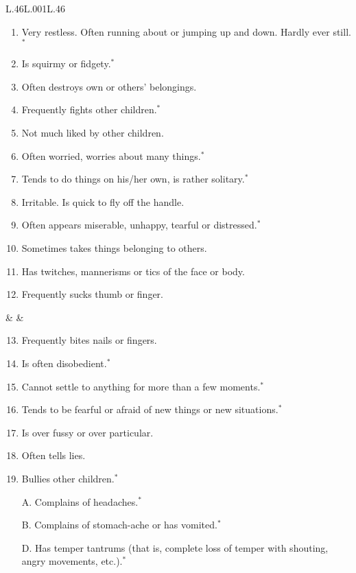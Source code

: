 \begin{table}[ht!]
\caption{Behavioural screening scales in the BCS and MCS five-year surveys}\label{tab:scales}
\centering{} \footnotesize
\begin{tabular}{L{.46\linewidth}L{.001\linewidth}L{.46\linewidth}}
\toprule
{} \\[-1.8em]
\begin{enumerate}
\item Very restless. Often running about or jumping up and down. Hardly ever still.$^*$
\item Is squirmy or fidgety.$^*$
\item Often destroys own or others' belongings.
\item Frequently fights other children.$^*$
\item Not much liked by other children.
\item Often worried, worries about many things.$^*$
\item Tends to do things on his/her own, is rather solitary.$^*$
\item Irritable. Is quick to fly off the handle.
\item Often appears miserable, unhappy, tearful or distressed.$^*$
\item Sometimes takes things belonging to others.
\item Has twitches, mannerisms or tics of the face or body.
\item Frequently sucks thumb or finger.
\end{enumerate}
& &
\begin{enumerate}\setcounter{enumi}{12}
\item Frequently bites nails or fingers.
\item Is often disobedient.$^*$
\item Cannot settle to anything for more than a few moments.$^*$
\item Tends to be fearful or afraid of new things or new situations.$^*$
\item Is over fussy or over particular.
\item Often tells lies.
\item Bullies other children.$^*$
\item[A.] Complains of headaches.$^*$
\item[B.] Complains of stomach-ache or has vomited.$^*$
\item[D.] Has temper tantrums (that is, complete loss of temper with shouting, angry movements, etc.).$^*$

\end{enumerate}
\end{tabular}
\end{table}
